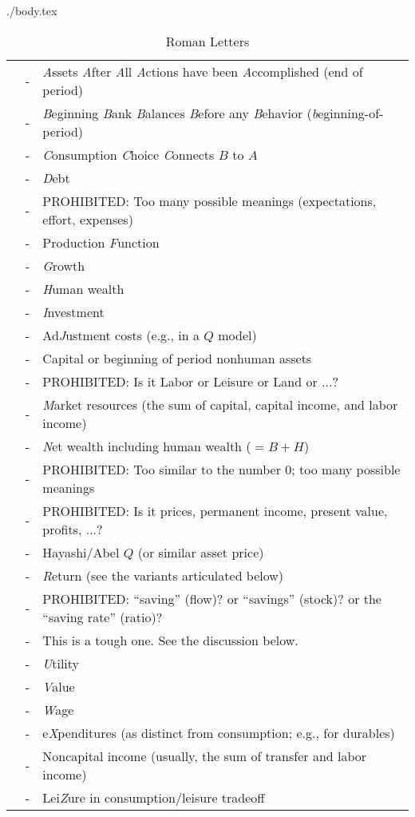 \documentclass{econtex}
\begin{document}
\begin{verbatimwrite}{./body.tex}
\pagebreak

\begin{table}[h]
\begin{center}
\begin{tabular}{lcl} \\
    \ALev & - & {\it A}ssets {\it A}fter {\it A}ll {\it A}ctions have been {\it A}ccomplished (end of period)
\\  \BLev & - & {\it B}eginning {\it B}ank {\it B}alances {\it B}efore any {\it B}ehavior ({\it b}eginning-of-period)
\\  \CLev & - & {\it C}onsumption {\it C}hoice {\it C}onnects $B$ to $A$
\\  \DLev & - & {\it D}ebt
\\  \ELev & - & PROHIBITED:  Too many possible meanings (expectations, effort, expenses)
\\  \FLev & - & Production {\it F}unction
\\  \GLev & - & {\it G}rowth 
\\  \HLev & - & {\it H}uman wealth
\\  \ILev & - & {\it I}nvestment
\\  \JLev & - & Ad{\it J}ustment costs (e.g., in a $Q$ model)
\\  \KLev & - & Capital or beginning of period nonhuman assets
\\  \LLev & - & PROHIBITED: Is it Labor or Leisure or Land or ...?
\\  \MLev & - & {\it M}arket resources (the sum of capital, capital income, and labor income)
\\  \NLev & - & {\it N}et wealth including human wealth ($=B + H$)
\\  \OLev & - & PROHIBITED: Too similar to the number 0; too many possible meanings
\\  \PLev & - & PROHIBITED: Is it prices, permanent income, present value, profits, ...?
\\  \QLev & - & Hayashi/Abel $Q$ (or similar asset price)
\\  \RLev & - & {\it R}eturn (see the variants articulated below)
\\  \SLev & - & PROHIBITED: ``saving'' (flow)? or ``savings'' (stock)? or the ``saving rate'' (ratio)?
\\  \TLev & - & This is a tough one.  See the discussion below.
\\  \ULev & - & {\it U}tility
\\  \VLev & - & {\it V}alue
\\  \WLev & - & {\it W}age
\\  \XLev & - & e{\it X}penditures (as distinct from consumption; e.g., for durables)
\\  \YLev & - & Noncapital income (usually, the sum of transfer and labor income)
\\  \ZLev & - & Lei{\it Z}ure in consumption/leisure tradeoff
\end{tabular}
\end{center}
\caption{Roman Letters}
\label{table:RomanLetters}
\end{table}


\end{verbatimwrite}
\end{document}
